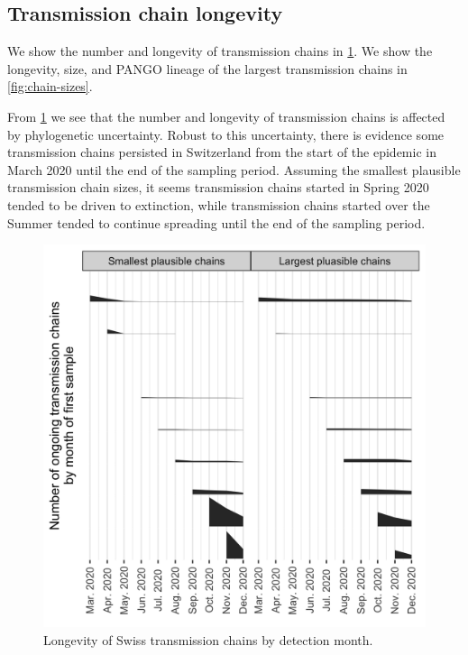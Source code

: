 \documentclass[9pt,twocolumn,twoside,lineno]{pnas-new}
\begin{document}

\subsection{Transmission chain longevity}
We show the number and longevity of transmission chains in \ref{fig:chain-longevity}. We show the longevity, size, and PANGO lineage of the largest transmission chains in \ref{fig:chain-sizes}.

From \ref{fig:chain-longevity} we see that the number and longevity of transmission chains is affected by phylogenetic uncertainty. Robust to this uncertainty, there is evidence some transmission chains persisted in Switzerland from the start of the epidemic in March 2020 until the end of the sampling period. Assuming the smallest plausible transmission chain sizes, it seems transmission chains started in Spring 2020 tended to be driven to extinction, while transmission chains started over the Summer tended to continue spreading until the end of the sampling period.

\begin{figure}[tbhp]
\centering
\includegraphics[width=.8\linewidth]{figures/fig_S1_chain_longevity.png}
\caption{Longevity of Swiss transmission chains by detection month.}
\label{fig:chain-longevity}
\end{figure}
\end{document}
